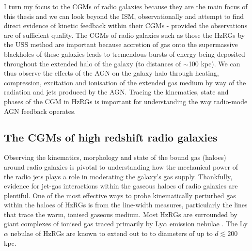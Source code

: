 \documentclass[10pt,a4paper]{article}
\begin{document}
I turn my focus to the CGMs of radio galaxies because they are the main focus of this thesis and we can look beyond the ISM, observationally and attempt to find direct evidence of kinetic feedback within their CGMs - provided the observations are of sufficient quality. The CGMs of radio galaxies such as those the HzRGs by the USS method are important because accretion of gas onto the supermassive blackholes of these galaxies leads to tremendous bursts of energy being deposited throughout the extended halo of the galaxy (to distances of $\sim$100 kpc). We can thus observe the effects of the AGN on the galaxy halo through heating, compression, excitation and ionisation of the extended gas medium by way of the radiation and jets produced by the AGN. Tracing the kinematics, state and phases of the CGM in HzRGs is important for understanding the way radio-mode AGN feedback operates. 

\subsection{The CGMs of high redshift radio galaxies} 
Observing the kinematics, morphology and state of the bound gas (haloes) around radio galaxies is pivotal to understanding how the mechanical power of the radio jets plays a role in moderating the galaxy's gas supply. Thankfully, evidence for jet-gas interactions within the gaseous haloes of radio galaxies are plentiful. One of the most effective ways to probe kinematically perturbed gas within the haloes of HzRGs is from the line-width measures, particularly the lines that trace the warm, ionised gaseous medium. Most HzRGs are surrounded by giant complexes of ionised gas traced primarily by Ly$\alpha$ emission nebulae \citep{mccarthy1990a,Reuland2003b}. The Ly$\alpha$ nebulae of HzRGs are known to extend out to to diameters of up to $d \lesssim 200$ kpc. 
\end{document}
